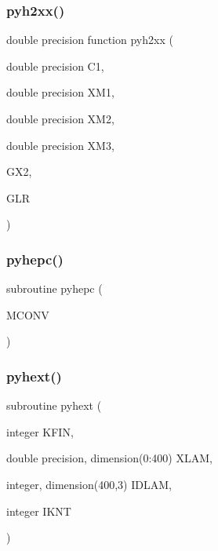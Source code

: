 \subsubsection{\texorpdfstring{pyh2xx()}{pyh2xx()}}
{\footnotesize\ttfamily double precision function pyh2xx (\begin{DoxyParamCaption}\item[{double precision}]{C1,  }\item[{double precision}]{X\+M1,  }\item[{double precision}]{X\+M2,  }\item[{double precision}]{X\+M3,  }\item[{}]{G\+X2,  }\item[{}]{G\+LR }\end{DoxyParamCaption})}

\mbox{\label{pythia-6_84_824_8f_a75df891b8b5e5b18d29325afa1f5e632}} 
\subsubsection{\texorpdfstring{pyhepc()}{pyhepc()}}
{\footnotesize\ttfamily subroutine pyhepc (\begin{DoxyParamCaption}\item[{}]{M\+C\+O\+NV }\end{DoxyParamCaption})}

\mbox{\label{pythia-6_84_824_8f_a22a3f7a152bcf344f26ebfe59ee78151}} 
\subsubsection{\texorpdfstring{pyhext()}{pyhext()}}
{\footnotesize\ttfamily subroutine pyhext (\begin{DoxyParamCaption}\item[{integer}]{K\+F\+IN,  }\item[{double precision, dimension(0\+:400)}]{X\+L\+AM,  }\item[{integer, dimension(400,3)}]{I\+D\+L\+AM,  }\item[{integer}]{I\+K\+NT }\end{DoxyParamCaption})}

